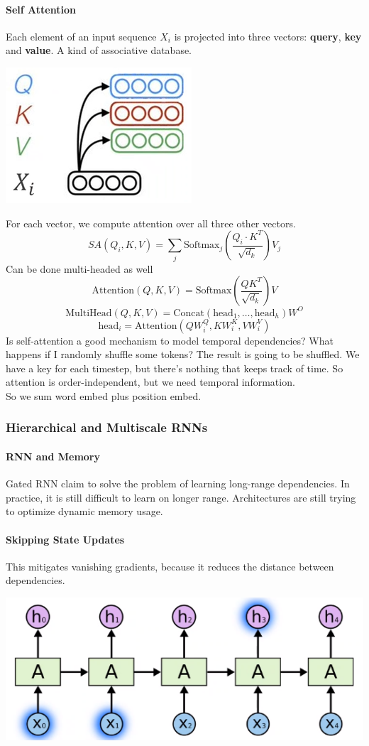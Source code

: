 \documentclass[10pt]{report}
\begin{document}
\paragraph{Self Attention} Each element of an input sequence $X_i$ is projected into three vectors: \textbf{query}, \textbf{key} and \textbf{value}. A kind of associative database.
\begin{center}
	\includegraphics[scale=0.5]{119.png}
\end{center}
For each vector, we compute attention over all three other vectors.
$$SA(Q_i, K, V) = \sum_j\text{Softmax}_j\left(\frac{Q_i\cdot K^T}{\sqrt{d_k}}\right)V_j$$
Can be done multi-headed as well
$$\text{Attention}(Q,K,V)=\text{Softmax}\left(\frac{QK^T}{\sqrt{d_k}}\right)V$$
$$\text{MultiHead}(Q,K,V) = \text{Concat}(\text{head}_1,\ldots,\text{head}_h)W^O$$
$$\text{head}_i = \text{Attention}(QW_i^Q, KW_i^K, VW_i^V)$$
Is self-attention a good mechanism to model temporal dependencies? What happens if I randomly shuffle some tokens? The result is going to be shuffled. We have a key for each timestep, but there's nothing that keeps track of time. So attention is order-independent, but we need temporal information.\\
So we sum word embed plus position embed.
\subsubsection{Hierarchical and Multiscale RNNs}
\paragraph{RNN and Memory} Gated RNN claim to solve the problem of learning long-range dependencies. In practice, it is still difficult to learn on longer range. Architectures are still trying to optimize dynamic memory usage.
\paragraph{Skipping State Updates} This mitigates vanishing gradients, because it reduces the distance between dependencies.
\begin{center}
	\includegraphics[scale=0.5]{120.png}
\end{center}
\end{document}
